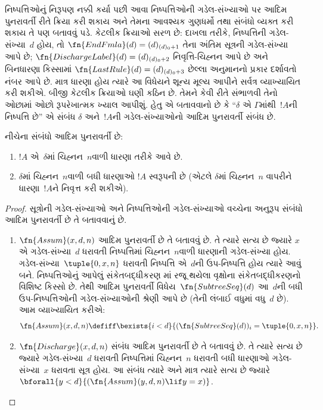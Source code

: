 \begin{explain}
નિષ્પત્તિઓનું નિરૂપણ નક્કી કર્યા પછી
આવા નિષ્પત્તિઓની ગડેલ-સંખ્યાઓ પર
આદિમ પુનરાવર્તી રીતે ક્રિયા કરી શકાય
અને તેમના આવશ્યક ગુણધર્મો તથા સંબંધો
વ્યક્ત કરી શકાય તે પણ બતાવવું પડે.
કેટલીક ક્રિયાઓ સરળ છે: દાખલા તરીકે,
નિષ્પત્તિની ગડેલ-સંખ્યા~$d$ હોય,
તો $\fn{EndFmla}(d) = (d)_{(d)_0+1}$
તેના અંતિમ સૂત્રની ગડેલ-સંખ્યા
આપે છે; $\fn{DischargeLabel}(d) = (d)_{(d)_0 + 2}$
નિવૃત્તિ-ચિહ્નન આપે છે અને બિનધારણા
કિસ્સામાં
$\fn{LastRule}(d) = (d)_{(d)_0 + 3}$
છેલ્લા અનુમાનનો પ્રકાર દર્શાવતો નંબર
આપે છે. માત્ર ધારણા હોય ત્યારે આ
વિધેયને શૂન્ય મૂલ્ય આપીને સર્વત્ર
વ્યાખ્યાયિત કરી શકીએ.
બીજી કેટલીક ક્રિયાઓ ઘણી કઠિન છે.
તેમને કેવી રીતે સંભાળવી તેનો ઓછામાં
ઓછો રૂપરેખાત્મક ખ્યાલ આપીશું. હેતુ
એ બતાવવાનો છે કે ``$\delta$ એ
$\Gamma$માંથી~$!A$ની
નિષ્પત્તિ છે'' એ સંબંધ
$\delta$ અને~$!A$ની ગડેલ-સંખ્યાઓનો
આદિમ પુનરાવર્તી સંબંધ છે.
\end{explain}

\begin{prop}
  નીચેના સંબંધો આદિમ પુનરાવર્તી છે:
  \begin{enumerate}
  \item $!A$ એ~$\delta$માં
    ચિહ્નન~$n$વાળી ધારણા તરીકે આવે છે.
  \item $\delta$માં ચિહ્નન~$n$વાળી
    બધી ધારણાઓ $!A$ સ્વરૂપની છે
    (એટલે $\delta$માં ચિહ્નન~$n$
    વાપરીને ધારણા~$!A$ને
    નિવૃત્ત કરી શકીએ).
  \end{enumerate}
\end{prop}

\begin{proof}
  સૂત્રોની ગડેલ-સંખ્યાઓ અને
  નિષ્પત્તિઓની ગડેલ-સંખ્યાઓ વચ્ચેના
  અનુરૂપ સંબંધો આદિમ પુનરાવર્તી છે
  તે બતાવવાનું છે.
  \begin{enumerate}
  \item $\fn{Assum}(x, d, n)$ આદિમ
    પુનરાવર્તી છે તે બતાવવું છે. તે
    ત્યારે સત્ય છે જ્યારે $x$ એ
    ગડેલ-સંખ્યા~$d$ ધરાવતી
    નિષ્પત્તિમાં ચિહ્નન~$n$વાળી
    ધારણાની ગડેલ-સંખ્યા હોય.
    ગડેલ-સંખ્યા~$\tuple{0, x,
      n}$ ધરાવતી નિષ્પત્તિ એ~$d$ની
    ઉપ-નિષ્પત્તિ હોય ત્યારે આવું બને.
    નિષ્પત્તિઓનું આપેલું
    સંકેતબદ્ધીકરણ
    માં રજૂ થયેલા
    વૃક્ષોના સંકેતબદ્ધીકરણનો વિશિષ્ટ
    કિસ્સો છે. તેથી આદિમ પુનરાવર્તી
    વિધેય~$\fn{SubtreeSeq}(d)$ આ~$d$ની
    બધી ઉપ-નિષ્પત્તિઓની ગડેલ-સંખ્યાઓની
    શ્રેણી આપે છે (તેની લંબાઈ વધુમાં
    વધુ~$d$ છે). આમ વ્યાખ્યાયિત કરીએ:
    \[
    \fn{Assum}(x, d, n) \defiff \bexists{i<d}{(\fn{SubtreeSeq}(d))_i =
      \tuple{0, x, n}}.
    \]
  \item $\fn{Discharge}(x, d, n)$
    સંબંધ આદિમ પુનરાવર્તી છે તે બતાવવું છે.
    તે ત્યારે સત્ય છે જ્યારે ગડેલ-સંખ્યા~$d$
    ધરાવતી નિષ્પત્તિમાં ચિહ્નન~$n$
    ધરાવતી બધી ધારણાઓ ગડેલ-સંખ્યા~$x$
    ધરાવતા સૂત્ર હોય. આ સંબંધ
    ત્યારે અને માત્ર ત્યારે સત્ય છે જ્યારે
    $\bforall{y<d}{(\fn{Assum}(y, d, n) \lif y
      = x)}$.
  \end{enumerate}
\end{proof}

